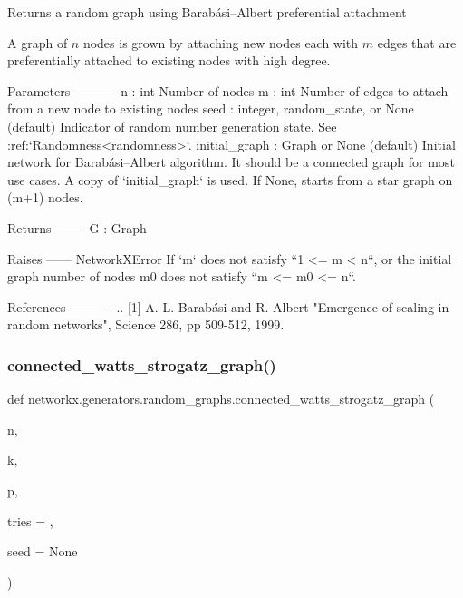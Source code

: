 \begin{DoxyVerb}Returns a random graph using Barabási–Albert preferential attachment

A graph of $n$ nodes is grown by attaching new nodes each with $m$
edges that are preferentially attached to existing nodes with high degree.

Parameters
----------
n : int
    Number of nodes
m : int
    Number of edges to attach from a new node to existing nodes
seed : integer, random_state, or None (default)
    Indicator of random number generation state.
    See :ref:`Randomness<randomness>`.
initial_graph : Graph or None (default)
    Initial network for Barabási–Albert algorithm.
    It should be a connected graph for most use cases.
    A copy of `initial_graph` is used.
    If None, starts from a star graph on (m+1) nodes.

Returns
-------
G : Graph

Raises
------
NetworkXError
    If `m` does not satisfy ``1 <= m < n``, or
    the initial graph number of nodes m0 does not satisfy ``m <= m0 <= n``.

References
----------
.. [1] A. L. Barabási and R. Albert "Emergence of scaling in
   random networks", Science 286, pp 509-512, 1999.
\end{DoxyVerb}
 \mbox{\label{namespacenetworkx_1_1generators_1_1random__graphs_ad8d78607ea86a214a610adb9be19cf2d}} 
\subsubsection{\texorpdfstring{connected\+\_\+watts\+\_\+strogatz\+\_\+graph()}{connected\_watts\_strogatz\_graph()}}
{\footnotesize\ttfamily def networkx.\+generators.\+random\+\_\+graphs.\+connected\+\_\+watts\+\_\+strogatz\+\_\+graph (\begin{DoxyParamCaption}\item[{}]{n,  }\item[{}]{k,  }\item[{}]{p,  }\item[{}]{tries = {},  }\item[{}]{seed = {\ttfamily None} }\end{DoxyParamCaption})}

